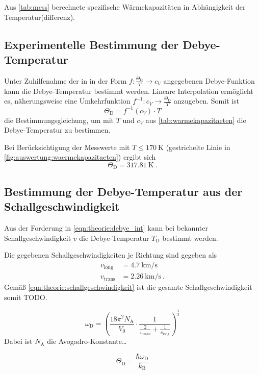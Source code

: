 \begin{table}
    \centering
    \caption{Aus \autoref{tab:mess} berechnete spezifische Wärmekapazitäten in Abhängigkeit der Temperatur(differenz).}
    \label{tab:warmekapazitaeten}
\end{table}


\subsection{Experimentelle Bestimmung der Debye-Temperatur}
\label{sec:auswertung:debye_exp}
Unter Zuhilfenahme der in \cite[Tabelle 1]{versuchsanleitung}
in der Form $f: \frac{\Theta_\text{D}}{T} \longrightarrow c_V$
angegebenen Debye-Funktion
kann die Debye-Temperatur bestimmt werden.
Lineare Interpolation ermöglicht es, näherungsweise eine Umkehrfunktion
$f^{-1}: c_V \longrightarrow \frac{\Theta_\text{D}}{T}$
anzugeben.
Somit ist
\[
    \Theta_\text{D} = f^{-1}(c_V) · T
\]
die Bestimmungsgleichung, um mit $T$ und $c_V$ aus \autoref{tab:warmekapazitaeten} die Debye-Temperatur zu bestimmen.

Bei Berücksichtigung der Messwerte mit $T \leq \SI{170}{\kelvin}$ (gestrichelte Linie in \autoref{fig:auswertung:waermekapazitaeten})
ergibt sich
\[
    \Theta_\text{D} = \SI{317.81}{\kelvin} \ .
\]


\subsection{Bestimmung der Debye-Temperatur aus der Schallgeschwindigkeit}
\label{sec:auswertung:debye_vs}
Aus der Forderung in \autoref{eqn:theorie:debye_int}
kann bei bekannter Schallgeschwindigkeit $v$ die Debye-Temperatur $T_\text{D}$ bestimmt werden.

Die gegebenen Schallgeschwindigkeiten je Richtung sind gegeben als \cite{versuchsanleitung}
\begin{align*}
    v_\text{long} &= \SI{4.7}{\kilo\meter\per\second} \\
    v_\text{trans} &= \SI{2.26}{\kilo\meter\per\second} \ .
\end{align*}
Gemäß \autoref{eqn:theorie:schallgeschwindigkeit} ist die gesamte Schallgeschwindigkeit somit TODO.



\begin{equation*}
    \omega_\text{D}
    = \left(
        \frac{18 \pi^2 N_\text{A}}{V_0} · \frac{1}{\frac{2}{v_\text{trans}} + \frac{1}{v_\text{long}}}
    \right)^{\frac{1}{3}}
\end{equation*}
Dabei ist $N_\text{A}$ die Avogadro-Konstante…

\[
    \Theta_\text{D} = \frac{\hbar\omega_\text{D}}{k_\text{B}}
\]
